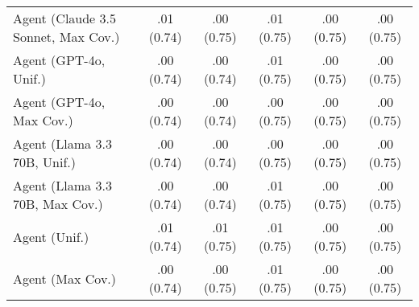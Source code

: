 \begin{table}[h!]
\begin{tabular}{lccccc}
    Agent (Claude 3.5 Sonnet, Max Cov.) & \cellcolor{bronze!30}.01 {\small (0.74)} & \cellcolor{bronze!30}.00 {\small (0.75)} & .01 {\small (0.75)} & .00 {\small (0.75)} & \cellcolor{bronze!30}.00 {\small (0.75)} \\
    Agent (GPT-4o, Unif.) & .00 {\small (0.74)} & .00 {\small (0.74)} & .01 {\small (0.75)} & \cellcolor{bronze!30}.00 {\small (0.75)} & \cellcolor{bronze!30}.00 {\small (0.75)} \\
    Agent (GPT-4o, Max Cov.) & .00 {\small (0.74)} & .00 {\small (0.74)} & .00 {\small (0.75)} & .00 {\small (0.75)} & \cellcolor{bronze!30}.00 {\small (0.75)} \\
    Agent (Llama 3.3 70B, Unif.) & .00 {\small (0.74)} & .00 {\small (0.74)} & .00 {\small (0.75)} & .00 {\small (0.75)} & .00 {\small (0.75)} \\
    Agent (Llama 3.3 70B, Max Cov.) & .00 {\small (0.74)} & .00 {\small (0.74)} & .01 {\small (0.75)} & \cellcolor{bronze!30}.00 {\small (0.75)} & \cellcolor{silver!30}.00 {\small (0.75)} \\
    Agent (Unif.) & \cellcolor{silver!30}.01 {\small (0.74)} & \cellcolor{silver!30}.01 {\small (0.75)} & \cellcolor{silver!30}.01 {\small (0.75)} & \cellcolor{silver!30}.00 {\small (0.75)} & \cellcolor{silver!30}.00 {\small (0.75)} \\
    Agent (Max Cov.) & .00 {\small (0.74)} & \cellcolor{bronze!30}.00 {\small (0.75)} & .01 {\small (0.75)} & \cellcolor{bronze!30}.00 {\small (0.75)} & \cellcolor{silver!30}.00 {\small (0.75)} \\
    \bottomrule
    \end{tabular}
\end{table}